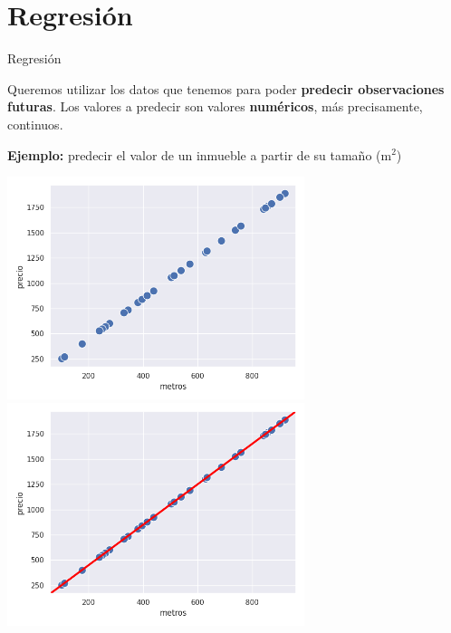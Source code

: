 \documentclass[aspectratio=169, usenames,dvipsnames]{beamer}
\begin{document}
\section{Regresión}

\begin{frame}
    \Huge{Regresión}
    \vspace{0.5em}
    
    \normalsize
    Queremos utilizar los datos que tenemos para poder \textbf{predecir observaciones futuras}. Los valores a predecir son valores \textbf{numéricos}, más precisamente, continuos.

    \vspace{1cm}
    \textbf{Ejemplo:} predecir el valor de un inmueble a partir de su tamaño (m$^2$)
    
\end{frame}

\begin{frame}
    \centering
    \vspace{-0.9cm}
    \begin{overprint}
    \centering\includegraphics[width=0.65\textwidth]{img/regresion_ej_01.png}
    \centering\includegraphics[width=0.65\textwidth]{img/regresion_ej_01_ok.png}
    \end{overprint}  
\end{frame}
\end{document}
